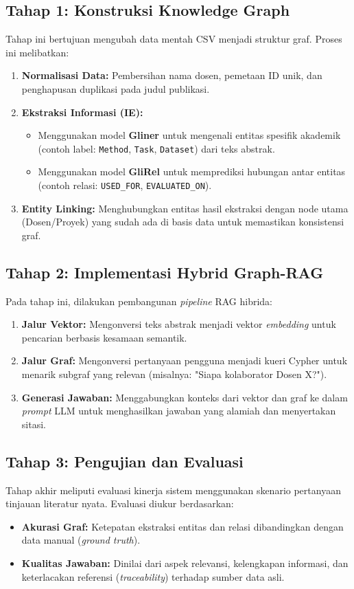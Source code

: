\subsection{Tahap 1: Konstruksi Knowledge Graph}
Tahap ini bertujuan mengubah data mentah CSV menjadi struktur graf. Proses ini melibatkan:
\begin{enumerate}
    \item \textbf{Normalisasi Data:} Pembersihan nama dosen, pemetaan ID unik, dan penghapusan duplikasi pada judul publikasi.
    \item \textbf{Ekstraksi Informasi (IE):}
    \begin{itemize}
        \item Menggunakan model \textbf{Gliner} untuk mengenali entitas spesifik akademik (contoh label: \texttt{Method}, \texttt{Task}, \texttt{Dataset}) dari teks abstrak.
        \item Menggunakan model \textbf{GliRel} untuk memprediksi hubungan antar entitas (contoh relasi: \texttt{USED\_FOR}, \texttt{EVALUATED\_ON}).
    \end{itemize}
    \item \textbf{Entity Linking:} Menghubungkan entitas hasil ekstraksi dengan node utama (Dosen/Proyek) yang sudah ada di basis data untuk memastikan konsistensi graf.
\end{enumerate}

\subsection{Tahap 2: Implementasi Hybrid Graph-RAG}
Pada tahap ini, dilakukan pembangunan \textit{pipeline} RAG hibrida:
\begin{enumerate}
    \item \textbf{Jalur Vektor:} Mengonversi teks abstrak menjadi vektor \textit{embedding} untuk pencarian berbasis kesamaan semantik.
    \item \textbf{Jalur Graf:} Mengonversi pertanyaan pengguna menjadi kueri Cypher untuk menarik subgraf yang relevan (misalnya: "Siapa kolaborator Dosen X?").
    \item \textbf{Generasi Jawaban:} Menggabungkan konteks dari vektor dan graf ke dalam \textit{prompt} LLM untuk menghasilkan jawaban yang alamiah dan menyertakan sitasi.
\end{enumerate}

\subsection{Tahap 3: Pengujian dan Evaluasi}
Tahap akhir meliputi evaluasi kinerja sistem menggunakan skenario pertanyaan tinjauan literatur nyata. Evaluasi diukur berdasarkan:
\begin{itemize}
    \item \textbf{Akurasi Graf:} Ketepatan ekstraksi entitas dan relasi dibandingkan dengan data manual (\textit{ground truth}).
    \item \textbf{Kualitas Jawaban:} Dinilai dari aspek relevansi, kelengkapan informasi, dan keterlacakan referensi (\textit{traceability}) terhadap sumber data asli.
\end{itemize}

